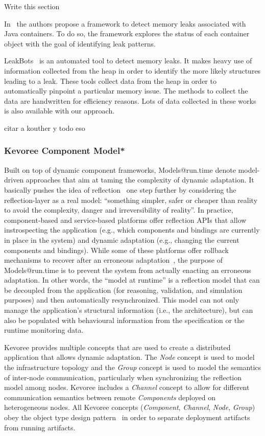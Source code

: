 {
	Write this section
}


In~\cite{Xu:2013:PML:2491509.2491511} the authors propose a framework to detect memory leaks associated with Java containers.
To do so, the framework explores the status of each container object with the goal of identifying leak patterns.

LeakBots~\cite{Mitchell03leakbot:an} is an automated tool to detect memory leaks. It makes heavy
use of information collected from the heap in order to identify the more likely structures leading to a leak.
These tools collect data from the heap in order to automatically pinpoint a particular memory issue.
The methods to collect the data are handwritten for efficiency reasons.
Lots of data collected in these works is also available with our approach.

citar a kouther y todo eso

\subsubsection{Kevoree Component Model*}
Built on top of dynamic component frameworks, Models@run.time denote model-driven approaches that aim at taming the complexity of dynamic adaptation.
It basically pushes the idea of reflection~\cite{morin09a} one step further by considering the reflection-layer as a real model: ``something simpler, safer or cheaper than reality to avoid the complexity, danger and irreversibility of reality''.
In practice, component-based and service-based platforms offer reflection APIs that allow instrospecting the application (e.g., which components and bindings are currently in place in the system) and dynamic adaptation (e.g., changing the current components and bindings).
While some of these platforms offer rollback mechanisms to recover after an erroneous adaptation~\cite{leger2010reliable}, the purpose of Models@run.time is to prevent the system from actually enacting an erroneous adaptation. 
In other words, the ``model at runtime'' is a reflection model that can be decoupled from the application (for reasoning, validation, and simulation purposes) and then automatically resynchronized.
This model can not only manage the application's structural information (i.e., the architecture), but can also be populated with behavioural information from the specification or the runtime monitoring data.

Kevoree provides multiple concepts that are used to create a distributed application that allows dynamic adaptation. The \emph{Node} concept is used to model the infrastructure topology and the \emph{Group} concept is used to model the semantics of inter-node communication, particularly when synchronizing the reflection model among nodes. 
Kevoree includes a \emph{Channel} concept to allow for different communication semantics between remote \emph{Components} deployed on heterogeneous nodes. 
All Kevoree concepts (\textit{Component}, \textit{Channel}, \textit{Node}, \textit{Group}) obey the object type design pattern~\cite{johnson_type_1997} in order to separate deployment artifacts from running artifacts.  

